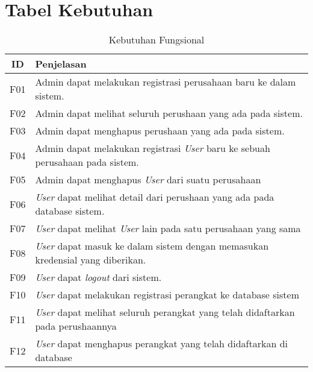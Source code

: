 \chapter{Tabel Kebutuhan}

\bgroup
\begin{table}[ht]
  \def\arraystretch{1.5}
  \caption{Kebutuhan Fungsional}
  \label{tab:kebutuhan-fungsional}
  \centering
  \begin{tabular}{|c|p{12cm}|}
    \hline
    ID  & Penjelasan                                                                                                      \\
    \hline
    F01 & Admin dapat melakukan registrasi perusahaan baru ke dalam sistem.                                               \\
    \hline
    F02 & Admin dapat melihat seluruh perushaan yang ada pada sistem.                                                     \\
    \hline
    F03 & Admin dapat menghapus perushaan yang ada pada sistem.                                                           \\
    \hline
    F04 & Admin dapat melakukan registrasi \textit{User} baru ke sebuah perusahaan pada sistem.
    \\
    \hline
    F05 & Admin dapat menghapus \textit{User} dari suatu perusahaan
    \\
    \hline
    F06 & \textit{User} dapat melihat detail dari perushaan yang ada pada database sistem.                                \\
    \hline
    F07 & \textit{User} dapat melihat \textit{User} lain pada satu perusahaan yang sama                                   \\
    \hline
    F08 & \textit{User} dapat masuk ke dalam sistem dengan memasukan kredensial yang diberikan.                           \\
    \hline
    F09 & \textit{User} dapat \textit{logout} dari sistem.                                                                \\
    \hline
    F10 & \textit{User} dapat melakukan registrasi perangkat ke database sistem                                           \\
    \hline
    F11 & \textit{User} dapat melihat seluruh perangkat yang telah didaftarkan pada perushaannya                          \\
    \hline
    F12 & \textit{User} dapat menghapus perangkat yang telah didaftarkan di database                                      \\

\end{tabular}
\end{table}
